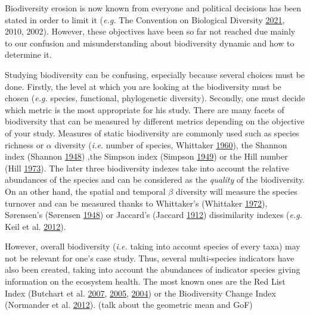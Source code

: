 \documentclass[
  12pt,
  oneside]{report}
\begin{document}
Biodiversity erosion is now known from everyone and political decisions has been stated in order to limit it (\emph{e.g.} The Convention on Biological Diversity \protect\hyperlink{ref-the_convention_on_biological_diversity_convention_2021}{2021}, 2010, 2002). However, these objectives have been so far not reached due mainly to our confusion and misunderstanding about biodiversity dynamic and how to determine it.

Studying biodiversity can be confusing, especially because several choices must be done. Firstly, the level at which you are looking at the biodiversity must be chosen (\emph{e.g.} species, functional, phylogenetic diversity). Secondly, one must decide which metric is the most appropriate for his study. There are many facets of biodiversity that can be measured by different metrics depending on the objective of your study. Measures of static biodiversity are commonly used such as species richness or \(\alpha\) diversity (\emph{i.e.} number of species, Whittaker \protect\hyperlink{ref-whittaker_vegetation_1960}{1960}), the Shannon index (Shannon \protect\hyperlink{ref-shannon_mathematical_1948}{1948}) ,the Simpson index (Simpson \protect\hyperlink{ref-simpson_measurement_1949}{1949}) or the Hill number (Hill \protect\hyperlink{ref-hill_diversity_1973}{1973}). The later three biodiversity indexes take into account the relative abundances of the species and can be considered as the \emph{quality} of the biodiversity. On an other hand, the spatial and temporal \(\beta\) diversity will measure the species turnover and can be measured thanks to Whittaker's (Whittaker \protect\hyperlink{ref-whittaker_evolution_1972}{1972}), Sørensen's (Sørensen \protect\hyperlink{ref-sorensen_method_1948}{1948}) or Jaccard's (Jaccard \protect\hyperlink{ref-jaccard_distribution_1912}{1912}) dissimilarity indexes (\emph{e.g.} Keil et al. \protect\hyperlink{ref-keil_patterns_2012}{2012}).

However, overall biodiversity (\emph{i.e.} taking into account species of every taxa) may not be relevant for one's case study. Thus, several multi-species indicators have also been created, taking into account the abundances of indicator species giving information on the ecosystem health. The most known ones are the Red List Index (Butchart et al. \protect\hyperlink{ref-butchart_improvements_2007}{2007}, \protect\hyperlink{ref-butchart_using_2005}{2005}, \protect\hyperlink{ref-butchart_measuring_2004}{2004}) or the Biodiversity Change Index (Normander et al. \protect\hyperlink{ref-normander_indicator_2012}{2012}). (talk about the geometric mean and GoF)
\end{document}
